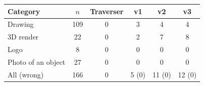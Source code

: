 \begin{tabular}{@{}lccccc@{}}
\toprule
Category & $n$ & Traverser & v1 & v2 & v3 \\
\midrule
Drawing & 109 & 0 & 3 & 4 & 4 \\
3D render & 22 & 0 & 2 & 7 & 8 \\
Logo & 8 & 0 & 0 & 0 & 0 \\
Photo of an object & 27 & 0 & 0 & 0 & 0 \\
All (wrong) & 166 & 0 & 5 (0) & 11 (0) & 12 (0) \\
\bottomrule
\end{tabular}
